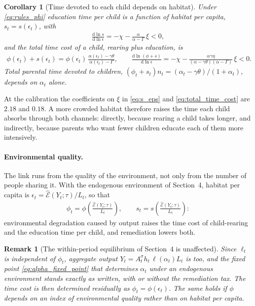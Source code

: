 \documentclass[11pt]{article}
\newtheorem{corollary}{Corollary}
\newtheorem{remark}{Remark}
\begin{document}
\begin{corollary}[Time devoted to each child depends on habitat]
\label{cor:time_per_child}
Under \eqref{eq:rules_phi} education time per child is a function of habitat per capita,
$s_t=s(\epsilon_t)$, with
\begin{align}
\frac{\mathrm{d}\ln s}{\mathrm{d}\ln\epsilon}
=-\chi-\frac{\alpha}{\alpha-\Gamma}\,\xi<0,
\label{eq:s_eps}
\end{align}
and the total time cost of a child, rearing plus education, is
\begin{align}
\phi(\epsilon_t)+s(\epsilon_t)=\phi(\epsilon_t)\,\frac{\alpha(\epsilon_t)-\gamma\theta}{\alpha(\epsilon_t)-\Gamma},
\qquad
\frac{\mathrm{d}\ln(\phi+s)}{\mathrm{d}\ln\epsilon}
=-\chi-\frac{\alpha\gamma\eta}{(\alpha-\gamma\theta)(\alpha-\Gamma)}\,\xi<0 .
\label{eq:total_time_cost}
\end{align}
Total parental time devoted to children, $(\phi_t+s_t)n_t=(\alpha_t-\gamma\theta)/(1+\alpha_t)$,
depends on $\alpha_t$ alone.
\end{corollary}

At the calibration the coefficients on $\xi$ in \eqref{eq:s_eps} and \eqref{eq:total_time_cost} are
$2.18$ and $0.18$. A more crowded habitat therefore raises the time each child absorbs through both
channels: directly, because rearing a child takes longer, and indirectly, because parents who want
fewer children educate each of them more intensively.

\paragraph{Environmental quality.}
The link runs from the quality of the environment, not only from the number of people sharing it.
With the endogenous environment of Section~4, habitat per capita is
$\epsilon_t=\widehat{\mathcal{E}}(Y_t;\tau)/L_t$, so that
\begin{align}
\phi_t=\phi\!\left(\frac{\widehat{\mathcal{E}}(Y_t;\tau)}{L_t}\right),
\qquad
s_t=s\!\left(\frac{\widehat{\mathcal{E}}(Y_t;\tau)}{L_t}\right):
\label{eq:phi_env}
\end{align}
environmental degradation caused by output raises the time cost of child-rearing and the education
time per child, and remediation lowers both.

\begin{remark}[The within-period equilibrium of Section~4 is unaffected]
\label{rem:fp_unchanged}
Since $\ell_t$ is independent of $\phi_t$, aggregate output
$Y_t=A_t^{\sigma}h_t\,\ell(\alpha_t)L_t$ is too, and the fixed point \eqref{eq:alpha_fixed_point}
that determines $\alpha_t$ under an endogenous environment stands exactly as written, with or
without the remediation tax. The time cost is then determined residually as
$\phi_t=\phi(\epsilon_t)$. The same holds if $\phi$ depends on an index of environmental quality
rather than on habitat per capita.
\end{remark}
\end{document}
